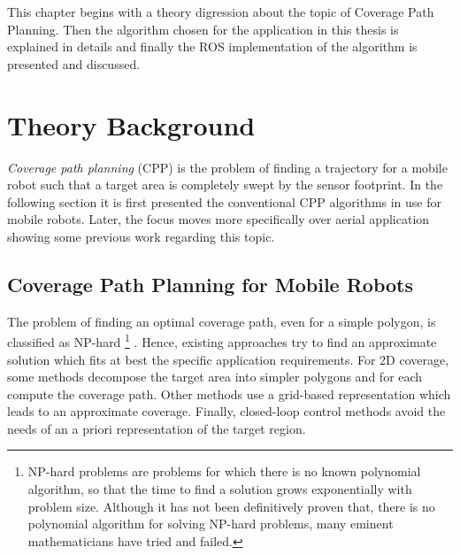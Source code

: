 This chapter begins with a theory digression about the topic of Coverage Path Planning. Then the algorithm chosen for the application in this thesis is explained in details and finally the ROS implementation of the algorithm is presented and discussed.
\section{Theory Background} %
\label{sec:theory_background}
\textit{Coverage path planning} (CPP) is the problem of finding a trajectory for a mobile robot such that a target area is completely swept by the sensor footprint. In the following section it is first presented the conventional CPP algorithms in use for mobile robots. Later, the focus moves more specifically over aerial application showing some previous work regarding this topic.

\subsection{Coverage Path Planning for Mobile Robots} %
\label{sub:coverage_path_planning_for_mobile_robots}
The problem of finding an optimal coverage path, even for a simple polygon, is classified as NP-hard \footnote{NP-hard problems are problems for which there is no known polynomial algorithm, so that the time to find a solution grows exponentially with problem size. Although it has not been definitively proven that, there is no polynomial algorithm for solving NP-hard problems, many eminent mathematicians have tried and failed.} \cite{ARKIN200025}. Hence, existing approaches try to find an approximate solution which fits at best the specific application requirements. For 2D coverage, some methods decompose the target area into simpler polygons and for each compute the coverage path. Other methods use a grid-based representation which leads to an approximate coverage. Finally, closed-loop control methods avoid the needs of an a priori representation of the target region.

